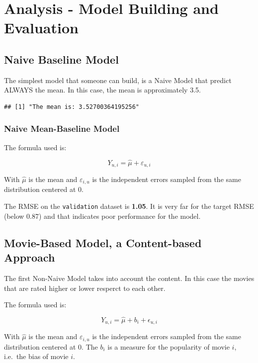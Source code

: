 \documentclass[]{article}
\begin{document}
\hypertarget{analysis---model-building-and-evaluation}{%
\section{Analysis - Model Building and
Evaluation}\label{analysis---model-building-and-evaluation}}

\hypertarget{naive-baseline-model}{%
\subsection{Naive Baseline Model}\label{naive-baseline-model}}

The simplest model that someone can build, is a Naive Model that predict
ALWAYS the mean. In this case, the mean is approximately 3.5.

\begin{verbatim}
## [1] "The mean is: 3.52700364195256"
\end{verbatim}

\hypertarget{naive-mean-baseline-model}{%
\subsubsection{Naive Mean-Baseline
Model}\label{naive-mean-baseline-model}}

The formula used is:

\[Y_{u,i} = \hat{\mu} + \varepsilon_{u,i}\]

With \(\hat{\mu}\) is the mean and \(\varepsilon_{i,u}\) is the
independent errors sampled from the same distribution centered at 0.

The RMSE on the \texttt{validation} dataset is \textbf{1.05}. It is very
far for the target RMSE (below 0.87) and that indicates poor performance
for the model.

\hypertarget{movie-based-model-a-content-based-approach}{%
\subsection{Movie-Based Model, a Content-based
Approach}\label{movie-based-model-a-content-based-approach}}

The first Non-Naive Model takes into account the content. In this case
the movies that are rated higher or lower resperct to each other.

The formula used is:

\[Y_{u,i} = \hat{\mu} + b_i + \epsilon_{u,i}\]

With \(\hat{\mu}\) is the mean and \(\varepsilon_{i,u}\) is the
independent errors sampled from the same distribution centered at 0. The
\(b_i\) is a measure for the popularity of movie \(i\), i.e.~the bias of
movie \(i\).
\end{document}
